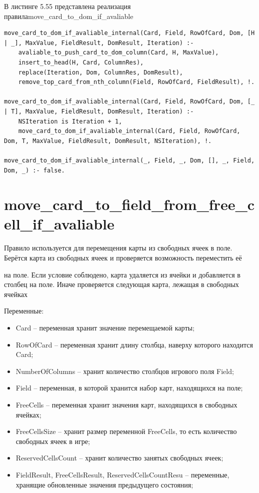 \documentclass[12pt]{report}
\begin{document}
В листинге 5.55 представлена реализация правила\newline move\_card\_to\_dom\_if\_avaliable

\begin{lstlisting}[label=some-code, caption=реализация правила move\_card\_to\_dom\_if\_avaliable]
move_card_to_dom_if_avaliable_internal(Card, Field, RowOfCard, Dom, [H | _], MaxValue, FieldResult, DomResult, Iteration) :-
	avaliable_to_push_card_to_dom_column(Card, H, MaxValue),
	insert_to_head(H, Card, ColumnRes),
	replace(Iteration, Dom, ColumnRes, DomResult),
	remove_top_card_from_nth_column(Field, RowOfCard, FieldResult), !.

move_card_to_dom_if_avaliable_internal(Card, Field, RowOfCard, Dom, [_ | T], MaxValue, FieldResult, DomResult, Iteration) :-
	NSIteration is Iteration + 1,
	move_card_to_dom_if_avaliable_internal(Card, Field, RowOfCard, Dom, T, MaxValue, FieldResult, DomResult, NSIteration), !.

move_card_to_dom_if_avaliable_internal(_, Field, _, Dom, [], _, Field, Dom, _) :- false.

\end{lstlisting}

\section{move\_card\_to\_field\_from\_free\_cell\_if\_avaliable}
Правило используется для перемещения карты из свободных ячеек в поле. Берётся карта из свободных ячеек и проверяется возможность переместить её

на поле. Если условие соблюдено, карта удаляется из ячейки и добавляется в столбец на поле. Иначе проверяется следующая карта, лежащая в свободных ячейках

Переменные:
\begin{itemize}
\item Card – переменная хранит значение перемещаемой карты;
\item RowOfCard – переменная хранит длину столбца, наверху которого находится Card;
\item NumberOfColumns – хранит количество столбцов игрового поля Field;
\item Field – переменная, в которой хранится набор карт, находящихся на поле;
\item FreeCells – переменная хранит значения карт, находящихся в свободных ячейках;
\item FreeCellsSize – хранит размер переменной FreeCells, то есть количество свободных ячеек в игре;
\item ReservedCellsCount – хранит количество занятых свободных ячеек;
\item FieldResult, FreeCellsResult, ReservedCellsCountResu – переменные, хранящие обновленные значения предыдущего состояния;
\end{itemize}
\end{document}
